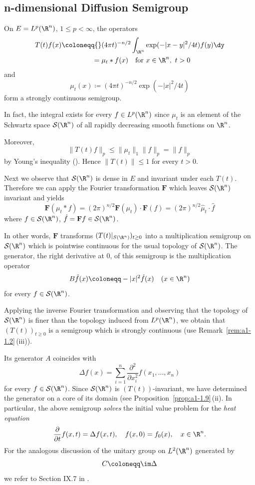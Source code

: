 \subsection{n-dimensional Diffusion Semigroup}\label{subsec:a1-2.8}%
On $E = L^{p}(\R^{n})$, $1 \leq p < \infty$, the operators
\begin{align*}
    T(t)f(x) \coloneqq{}& (4\pi t)^{-n/2} \int_{\R^{n}} \exp(-|x-y|^{2}/4t)f(y)\dy \\
    ={}& \mu_{t}*f(x)\quad \text{for }x \in \R^{n}, \  t > 0 
\end{align*}
%
and 
\[
\mu_{t}(x) \coloneqq (4\pi t)^{-n/2} \exp(-|x|^{2}/4t)
\]
form a strongly continuous semigroup.

In fact, the integral exists for every $f \in L^{p}(\R^{n})$ since $\mu_{t}$ is an element of the Schwartz space $\mathcal{S}(\R^{n})$ of all rapidly decreasing smooth functions on $\R^{n}$.

Moreover,
\[
    \|T(t)f\|_{p} \leq \|\mu_{t}\|_{1}\|f\|_{p} = \|f\|_{p}
\]
by Young's inequality (\textcite[p.28]{reedsimon:1975}). Hence $\|T(t)\| \leq 1$ for every $t > 0$.

Next we observe that $\mathcal{S}(\R^{n})$ is dense in $E$ and invariant under each $T(t)$.
Therefore we can apply the Fourier transformation $\mathbf{F}$ which leaves $\mathcal{S}(\R^{n})$ invariant and yields
\[
    \mathbf{F}(\mu_{t}*f) = (2\pi)^{n/2} \mathbf{F}(\mu_{t}) \cdot \mathbf{F}(f) 
    = (2\pi)^{n/2} \widehat{\mu}_{t}\cdot\widehat{f}
\]
where $f \in \mathcal{S}(\R^{n})$, $\hat{f} = \mathbf{F}f \in \mathcal{S}(\R^{n})$.

In other words, $\mathbf{F}$ transforms $(T(t)\vert_{ S(\R^{n})})_{t \geq 0}$ into a multiplication semigroup on $\mathcal{S}(\R^{n})$ which is pointwise continuous for the usual topology of\/ $\mathcal{S}(\R^{n})$.
The generator, \ie the right derivative at $0$, of this semigroup is the multiplication operator
\[
    B\hat{f}(x) \coloneqq -|x|^{2}\hat{f}(x) \quad (x \in \R^{n})
\]
for every $f \in \mathcal{S}(\R^{n})$.

Applying the inverse Fourier transformation and observing that the topology of\/ $\mathcal{S}(\R^{n})$ is finer than the topology induced from $L^{p}(\R^{n})$, we obtain that $(T(t))_{t \geq 0}$ is a semigroup which is strongly continuous (use Remark~\ref{rem:a1-1.2}\,(iii)).

Its generator $A$ coincides with
\[
    \Delta f(x) = \sum_{i=1}^{n} \frac{\partial^{2}}{\partial x_{i}^{2}} f(x_{1},\ldots,x_{n})
\]
for every $f \in \mathcal{S}(\R^{n})$.
Since $\mathcal{S}(\R^{n})$ is $(T(t))$-invariant, we have determined the generator on a core of its domain (see Proposition~\ref{prop:a1-1.9}\,(ii).
In particular, the above semigroup \emph{solves} the initial value problem for the \emph{heat equation}
\[
    \frac{\partial}{\partial t} f(x,t) = \Delta f(x,t), \quad f(x,0) = f_{0}(x), \quad x \in \R^{n}.
\]
For the analogous discussion of the unitary group on $L^{2}(\R^{n})$ generated by
\[
    C \coloneqq \im\Delta
\]
we refer to Section IX.7 in \textcite{reedsimon:1975}. 

